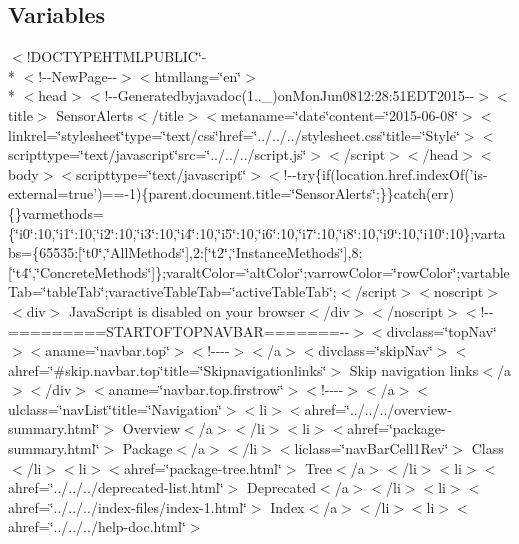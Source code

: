 \subsection*{Variables}
\begin{DoxyCompactItemize}
\item 
$<$!D\-O\-C\-T\-Y\-P\-E\-H\-T\-M\-L\-P\-U\-B\-L\-I\-C\char`\"{}-\/\\*
$<$!-\/-\/New\-Page-\/-\/$>$$<$htmllang=\char`\"{}en\char`\"{}$>$\\*
$<$head$>$$<$!-\/-\/Generatedbyjavadoc(1..\-\_)on\-Mon\-Jun0812\-:28\-:51\-E\-D\-T2015-\/-\/$>$$<$title$>$ Sensor\-Alerts$<$/title$>$$<$metaname=\char`\"{}date\char`\"{}content=\char`\"{}2015-\/06-\/08\char`\"{}$>$$<$linkrel=\char`\"{}stylesheet\char`\"{}type=\char`\"{}text/css\char`\"{}href=\char`\"{}../../../stylesheet.\-css\char`\"{}title=\char`\"{}\-Style\char`\"{}$>$$<$scripttype=\char`\"{}text/javascript\char`\"{}src=\char`\"{}../../../script.\-js\char`\"{}$>$$<$/script$>$$<$/head$>$$<$body$>$$<$scripttype=\char`\"{}text/javascript\char`\"{}$>$$<$!-\/-\/try\{if(location.\-href.\-index\-Of('is-\/external=true')==-\/1)\{parent.\-document.\-title=\char`\"{}\-Sensor\-Alerts\char`\"{};\}\}catch(err)\{\}varmethods=\{\char`\"{}i0\char`\"{}\-:10,\char`\"{}i1\char`\"{}\-:10,\char`\"{}i2\char`\"{}\-:10,\char`\"{}i3\char`\"{}\-:10,\char`\"{}i4\char`\"{}\-:10,\char`\"{}i5\char`\"{}\-:10,\char`\"{}i6\char`\"{}\-:10,\char`\"{}i7\char`\"{}\-:10,\char`\"{}i8\char`\"{}\-:10,\char`\"{}i9\char`\"{}\-:10,\char`\"{}i10\char`\"{}\-:10\};vartabs=\{65535\-:\mbox{[}\char`\"{}t0\char`\"{},\char`\"{}\-All\-Methods\char`\"{}\mbox{]},2\-:\mbox{[}\char`\"{}t2\char`\"{},\char`\"{}\-Instance\-Methods\char`\"{}\mbox{]},8\-:\mbox{[}\char`\"{}t4\char`\"{},\char`\"{}\-Concrete\-Methods\char`\"{}\mbox{]}\};varalt\-Color=\char`\"{}alt\-Color\char`\"{};varrow\-Color=\char`\"{}row\-Color\char`\"{};vartable\-Tab=\char`\"{}table\-Tab\char`\"{};varactive\-Table\-Tab=\char`\"{}active\-Table\-Tab\char`\"{};$<$/script$>$$<$noscript$>$$<$div$>$ Java\-Script is disabled on your browser$<$/div$>$$<$/noscript$>$$<$!-\/-\/=========\-S\-T\-A\-R\-T\-O\-F\-T\-O\-P\-N\-A\-V\-B\-A\-R=======-\/-\/$>$$<$divclass=\char`\"{}top\-Nav\char`\"{}$>$$<$aname=\char`\"{}navbar.\-top\char`\"{}$>$$<$!-\/-\/-\/-\/$>$$<$/a$>$$<$divclass=\char`\"{}skip\-Nav\char`\"{}$>$$<$ahref=\char`\"{}\#skip.\-navbar.\-top\char`\"{}title=\char`\"{}\-Skipnavigationlinks\char`\"{}$>$ Skip navigation links$<$/a$>$$<$/div$>$$<$aname=\char`\"{}navbar.\-top.\-firstrow\char`\"{}$>$$<$!-\/-\/-\/-\/$>$$<$/a$>$$<$ulclass=\char`\"{}nav\-List\char`\"{}title=\char`\"{}\-Navigation\char`\"{}$>$$<$li$>$$<$ahref=\char`\"{}../../../overview-\/summary.\-html\char`\"{}$>$ Overview$<$/a$>$$<$/li$>$$<$li$>$$<$ahref=\char`\"{}package-\/summary.\-html\char`\"{}$>$ Package$<$/a$>$$<$/li$>$$<$liclass=\char`\"{}nav\-Bar\-Cell1\-Rev\char`\"{}$>$ Class$<$/li$>$$<$li$>$$<$ahref=\char`\"{}package-\/tree.\-html\char`\"{}$>$ Tree$<$/a$>$$<$/li$>$$<$li$>$$<$ahref=\char`\"{}../../../deprecated-\/list.\-html\char`\"{}$>$ Deprecated$<$/a$>$$<$/li$>$$<$li$>$$<$ahref=\char`\"{}../../../index-\/files/index-\/1.\-html\char`\"{}$>$ Index$<$/a$>$$<$/li$>$$<$li$>$$<$ahref=\char`\"{}../../../help-\/doc.\-html\char`\"{}$>$ $$
\end{DoxyCompactItemize}
